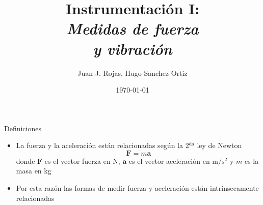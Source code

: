 \documentclass[aspectratio=169]{beamer}
\title{Instrumentación I: \\ \emph{Medidas de fuerza}\\ \emph{y vibración}}
\author{
    Juan J. Rojas, Hugo Sanchez Ortiz
}
\institute{Instituto Tecnológico de Costa Rica}
\date{\today}
\begin{document}

\maketitle

\newcommand{\blackandwhite}{white} %

\begin{frame}{Definiciones}
    \begin{itemize}
        \item La fuerza y la aceleración están relacionadas según la 2$^\mathrm{da}$ ley de Newton
        \begin{equation*}
            \mathbf{F} = m\mathbf{a}
        \end{equation*}
        donde $\mathbf{F}$ es el vector fuerza en \si{\newton}, $\mathbf{a}$ es el vector aceleración en $\si{\meter/\second\squared}$ y  $m$ es la masa en \si{\kilo\gram}
        \item Por esta razón las formas de medir fuerza y aceleración están intrínsecamente relacionadas
    \end{itemize}
\end{frame}
\end{document}
